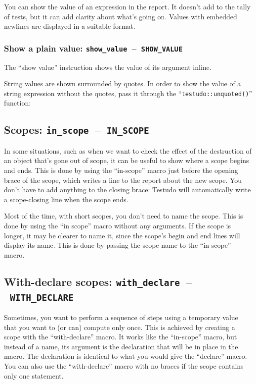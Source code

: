 \documentclass[twoside, a4paper, article]{memoir}
\newcommand*\testudocolor{\color{red!80!blue}}
\newcommand*\testudo[1]{\texttt{\testudocolor{}#1}}
\newcommand*\testudopair[2]{\testudo{#1}~--~\testudo{#2}}
\newcommand\subsectiontestudopair[3]{%
  \subsection[#1]{#1: \testudopair{#2}{#3}}}
\newcommand\subsubsectiontestudopair[3]{%
  \subsubsection[#1]{#1: \testudopair{#2}{#3}}}
\providecommand\typesetexample[1]{%
}
\begin{document}
You can show the value of an expression in the report.  It doesn't add to the
tally of tests, but it can add clarity about what's going on.  Values with
embedded newlines are displayed in a suitable format.

\subsubsectiontestudopair{Show a plain value}%
  {show\_value}{SHOW\_VALUE}
\label{sec:show-plain-value}

The ``show value'' instruction shows the value of its argument inline.

\typesetexample{show-value}

String values are shown surrounded by quotes.  In order to show the value of a
string expression without the quotes, pass it through the
``\texttt{testudo::unquoted()}'' function:

\typesetexample{show-value-unquoted}

\subsectiontestudopair{Scopes}{in\_scope}{IN\_SCOPE}
\label{sec:scopes}

In some situations, such as when we want to check the effect of the destruction
of an object that's gone out of scope, it can be useful to show where a scope
begins and ends.  This is done by using the ``in-scope'' macro just before the
opening brace of the scope, which writes a line to the report about the new
scope.  You don't have to add anything to the closing brace: Testudo will
automatically write a scope-closing line when the scope ends.

Most of the time, with short scopes, you don't need to name the scope.  This is
done by using the ``in scope'' macro without any arguments.  If the scope is
longer, it may be clearer to name it, since the scope's begin and end lines
will display its name.  This is done by passing the scope name to the
``in-scope'' macro.

\typesetexample{in-scope}

\subsectiontestudopair{With-declare scopes}{with\_declare}{WITH\_DECLARE}
\label{sec:with-declare-scopes}

Sometimes, you want to perform a sequence of steps using a temporary value that
you want to (or can) compute only once.  This is achieved by creating a scope
with the ``with-declare'' macro.  It works like the ``in-scope'' macro, but
instead of a name, its argument is the declaration that will be in place in the
macro.  The declaration is identical to what you would give the ``declare''
macro.  You can also use the ``with-declare'' macro with no braces if the scope
contains only one statement.

\typesetexample{with-declare}
\end{document}

